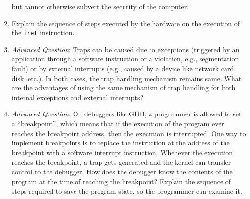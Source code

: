 \begin{enumerate}
but cannot otherwise subvert the security of the computer.
\item Explain the sequence of steps executed by the hardware on the execution of the {\tt iret}
instruction.
\item {\em Advanced Question}:
Traps can be caused due to exceptions (triggered by an application through a software
instruction or a violation, e.g., segmentation fault) or by external interrupts (e.g.,
caused by a device like network card, disk, etc.). In both cases, the trap handling mechanism
remains same. What are the advantages of using the same mechanism of trap handling for
both internal exceptions and external interrupts?
\item {\em Advanced Question}: On debuggers like GDB, a programmer is allowed to set a
``breakpoint'', which means that if the execution of the program ever reaches the breakpoint
address, then the execution is interrupted. One way to implement breakpoints is to
replace the instruction at the address of the breakpoint with a software interrupt
instruction. Whenever the execution reaches the breakpoint, a trap gets generated
and the kernel can transfer control to the debugger. How does the debugger know the
contents of the program at the time of reaching the breakpoint? Explain the sequence of
steps required to save the program state, so the programmer can examine it.


\end{enumerate}
